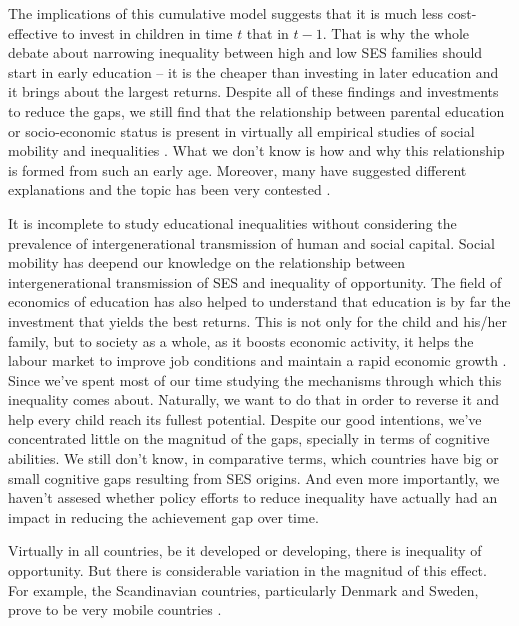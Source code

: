 \documentclass[11pt, a4paper]{article}\usepackage[]{graphicx}\usepackage[]{color}
\begin{document}
The implications of this cumulative model suggests that it is much less cost-effective to invest in children in time \(t\) that in \(t-1\). That is why the whole debate about narrowing inequality between high and low SES families should start in early education -- it is the cheaper than investing in later education and it brings about the largest returns. Despite all of these findings and investments to reduce the gaps, we still find that the relationship between parental education or socio-economic status is present in virtually all empirical studies of social mobility and inequalities \citep{breen1997, breen2007, waldfogel2006, bradbury2015, chetty2016}. What we don't know is how and why this relationship is formed from such an early age. Moreover, many have suggested different explanations and the topic has been very contested \citep{brooks1997}.

It is incomplete to study educational inequalities without considering the prevalence of intergenerational transmission of human and social capital. Social mobility has deepend our knowledge on the relationship between intergenerational transmission of SES and inequality of opportunity. The field of economics of education has also helped to understand that education is by far the investment that yields the best returns. This is not only for the child and his/her family, but to society as a whole, as it boosts economic activity, it helps the labour market to improve job conditions and maintain a rapid economic growth \citep{hanushek2007}. Since \citet{coleman1966} we've spent most of our time studying the mechanisms through which this inequality comes about. Naturally, we want to do that in order to reverse it and help every child reach its fullest potential. Despite our good intentions, we've concentrated little on the magnitud of the gaps, specially in terms of cognitive abilities. We still don't know, in comparative terms, which countries have big or small cognitive gaps resulting from SES origins. And even more importantly, we haven't assesed whether policy efforts to reduce inequality have actually had an impact in reducing the achievement gap over time.

Virtually in all countries, be it developed or developing, there is inequality of opportunity. But there is considerable variation in the magnitud of this effect. For example, the Scandinavian countries, particularly Denmark and Sweden, prove to be very mobile countries \citep{esping2012, breen2007, shavit1993}.
\end{document}
